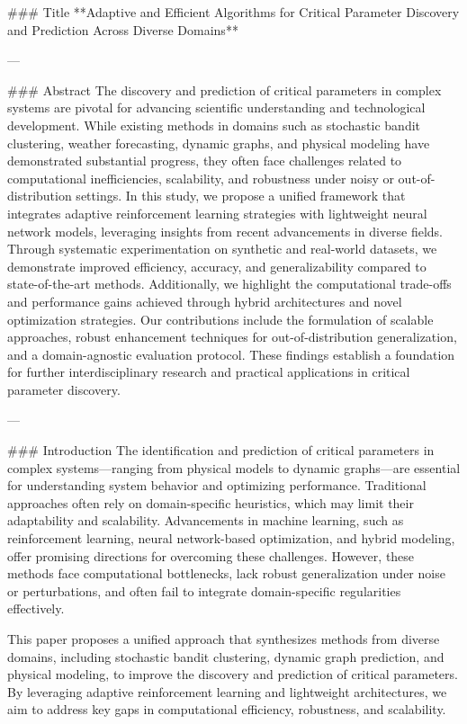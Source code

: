 ### Title  
**Adaptive and Efficient Algorithms for Critical Parameter Discovery and Prediction Across Diverse Domains**

---

### Abstract  
The discovery and prediction of critical parameters in complex systems are pivotal for advancing scientific understanding and technological development. While existing methods in domains such as stochastic bandit clustering, weather forecasting, dynamic graphs, and physical modeling have demonstrated substantial progress, they often face challenges related to computational inefficiencies, scalability, and robustness under noisy or out-of-distribution settings. In this study, we propose a unified framework that integrates adaptive reinforcement learning strategies with lightweight neural network models, leveraging insights from recent advancements in diverse fields. Through systematic experimentation on synthetic and real-world datasets, we demonstrate improved efficiency, accuracy, and generalizability compared to state-of-the-art methods. Additionally, we highlight the computational trade-offs and performance gains achieved through hybrid architectures and novel optimization strategies. Our contributions include the formulation of scalable approaches, robust enhancement techniques for out-of-distribution generalization, and a domain-agnostic evaluation protocol. These findings establish a foundation for further interdisciplinary research and practical applications in critical parameter discovery.

---

### Introduction  
The identification and prediction of critical parameters in complex systems—ranging from physical models to dynamic graphs—are essential for understanding system behavior and optimizing performance. Traditional approaches often rely on domain-specific heuristics, which may limit their adaptability and scalability. Advancements in machine learning, such as reinforcement learning, neural network-based optimization, and hybrid modeling, offer promising directions for overcoming these challenges. However, these methods face computational bottlenecks, lack robust generalization under noise or perturbations, and often fail to integrate domain-specific regularities effectively.  

This paper proposes a unified approach that synthesizes methods from diverse domains, including stochastic bandit clustering, dynamic graph prediction, and physical modeling, to improve the discovery and prediction of critical parameters. By leveraging adaptive reinforcement learning and lightweight architectures, we aim to address key gaps in computational efficiency, robustness, and scalability.


